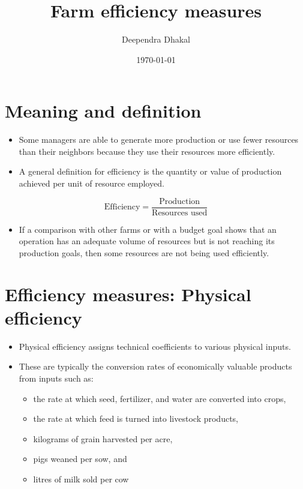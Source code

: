 \documentclass[12pt,ignorenonframetext,aspectratio=169]{beamer}
\title{\insertsectionhead}
  {
    \definecolor{white}{rgb}{0.776,0.357,0.157}
    \definecolor{iqss@orange}{rgb}{1,1,1}
    \ifnum \insertmainframenumber > \insertframenumber
    \frame{
      \frametitle{\iqsssectiontitleheader}
      \tableofcontents[currentsection]
    }
    \else
    \frame{
      \frametitle{Backup Slides}
      \tableofcontents[sectionstyle=shaded/shaded,subsectionstyle=shaded/shaded/shaded]
    }
    \fi
  }
\title[]{Farm efficiency measures}
\author[
        Deependra Dhakal
    ]{Deependra Dhakal}
\institute[
    ]{
    GAASC, Baitadi \and Tribhuwan University
    }
\date[
      \today
  ]{
      \today
        }
\providecommand{\tightlist}{%
  \setlength{\itemsep}{0pt}\setlength{\parskip}{0pt}}
\begin{document}
  \begin{frame}[plain]
  \titlepage
  \end{frame}



\hypertarget{meaning-and-definition}{%
\section{Meaning and definition}\label{meaning-and-definition}}

\begin{frame}{}
\protect\hypertarget{section}{}
\begin{itemize}
\tightlist
\item
  Some managers are able to generate more production or use fewer
  resources than their neighbors because they use their resources more
  efficiently.
\item
  A general definition for efficiency is the quantity or value of
  production achieved per unit of resource employed.
\end{itemize}

\[
\textrm{Efficiency} = \frac{\textrm{Production}}{\textrm{Resources used}}
\]

\begin{itemize}
\tightlist
\item
  If a comparison with other farms or with a budget goal shows that an
  operation has an adequate volume of resources but is not reaching its
  production goals, then some resources are not being used efficiently.
\end{itemize}
\end{frame}

\hypertarget{efficiency-measures-physical-efficiency}{%
\section{Efficiency measures: Physical
efficiency}\label{efficiency-measures-physical-efficiency}}

\begin{frame}{}
\protect\hypertarget{section-1}{}
\begin{itemize}
\tightlist
\item
  Physical efficiency assigns technical coefficients to various physical
  inputs.
\item
  These are typically the conversion rates of economically valuable
  products from inputs such as:

  \begin{itemize}
  \tightlist
  \item
    the rate at which seed, fertilizer, and water are converted into
    crops,
  \item
    the rate at which feed is turned into livestock products,
  \item
    kilograms of grain harvested per acre,
  \item
    pigs weaned per sow, and
  \item
    litres of milk sold per cow
  \end{itemize}
\end{itemize}
\end{frame}
\end{document}
